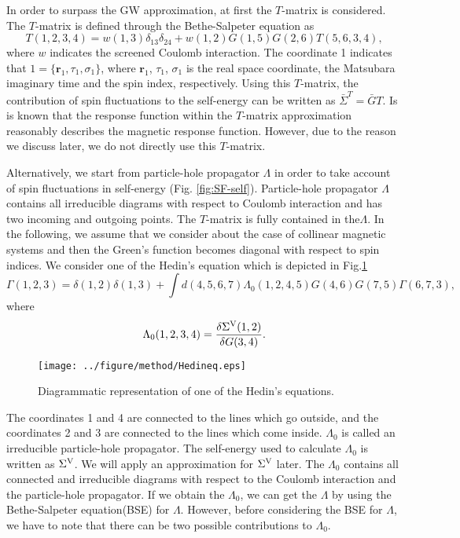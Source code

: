 In order to surpass the GW approximation, at first the $T$-matrix\cite{Gordon1961,Ersoy2010} is considered.
The $T$-matrix is defined through the Bethe-Salpeter equation\cite{BSE1951} as
%
\begin{equation}
	T(1,2,3,4) = w(1,3)\delta_{13}\delta_{24} + 
	w(1,2)G(1,5)G(2,6)T(5,6,3,4),
	\label{eq:T-BSE}
\end{equation}
%
where $w$ indicates the screened Coulomb interaction.
The coordinate 1 indicates that $1=\{\bm r_1, \tau_1, \sigma_1\}$, 
where $\bm r_1$, $\tau_1$, $\sigma_1$ is the real space coordinate,
the Matsubara imaginary time and the spin index, respectively.
Using this $T$-matrix, the contribution of spin fluctuations to the self-energy can be written as $\bar{\Sigma}^{T}=\bar{G}T$.
Is is known that the response function within the $T$-matrix approximation reasonably describes the magnetic response function\cite{Ersoy2010,Onida2002}.
However, due to the reason we discuss later, we do not directly use this $T$-matrix.

Alternatively, we start from particle-hole propagator $\Lambda$ in order to 
take account of spin fluctuations in self-energy (Fig. \ref{fig:SF-self}).
Particle-hole propagator $\Lambda$ contains all irreducible 
diagrams with respect to Coulomb interaction and has two 
incoming and outgoing points. The $T$-matrix is fully contained in the$\Lambda$.
In the following, we assume that we consider about the case of collinear magnetic systems and 
then the Green's function becomes diagonal with respect to spin indices.
We consider one of the Hedin's equation\cite{Sole1994} which is depicted
in Fig.\ref{fig:Hedineq}
%
\begin{equation}
	\Gamma(1,2,3) = \delta(1,2)\delta(1,3) + 
	\int d(4,5,6,7)\Lambda_0(1,2,4,5)
	G(4,6)G(7,5)\Gamma(6,7,3),
	\label{eq:Hedineq}
\end{equation}
%
where 
%
\begin{equation}
	\Lambda_0(1,2,3,4) = \frac{\delta\Sigma^{\rm V}(1,2)}{\delta G(3,4)}.
	\label{eq:lambda0}
\end{equation}
%
\begin{figure} %
	\centering
	\texttt{[image: ../figure/method/Hedineq.eps]}
	\caption{Diagrammatic representation of one of the Hedin's equations.}
	\label{fig:Hedineq}
\end{figure}
The coordinates 1 and 4 are connected to the lines which go outside,
and the coordinates 2 and 3 are connected to the lines which come inside.
$\Lambda_0$ is called an irreducible particle-hole propagator\cite{Arya2008}.
The self-energy used to calculate $\Lambda_0$ is written as $\Sigma^{\rm V}$.
We will apply an approximation for $\Sigma^{\rm V}$ later.
The $\Lambda_0$ contains all connected and irreducible diagrams with
respect to the Coulomb interaction and the particle-hole propagator.
If we obtain the $\Lambda_0$, we can get the $\Lambda$ by using the
Bethe-Salpeter equation(BSE)\cite{BSE1951} for $\Lambda$.
However, before considering the BSE for $\Lambda$, we have to note that
there can be two possible contributions to $\Lambda_0$.

